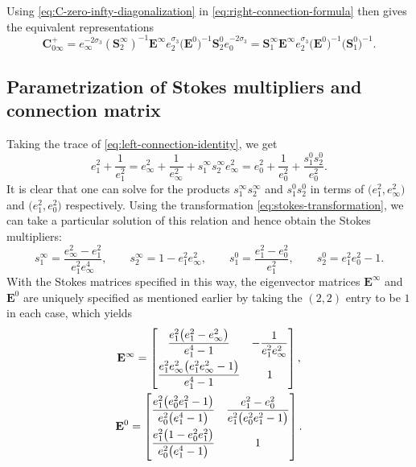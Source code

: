 \documentclass[11pt]{article}
\numberwithin{equation}{section}
\numberwithin{equation}{section}
\begin{document}
 Using \eqref{eq:C-zero-infty-diagonalization} in \eqref{eq:right-connection-formula} then gives the equivalent representations
 \begin{equation}
 \mathbf{C}_{0\infty}^+
 =e_\infty^{-2\sigma_3}(\mathbf{S}_{2}^\infty )^{-1}\mathbf{E}^\infty e_2^{\sigma_3}\big(\mathbf{E}^0\big)^{-1}\mathbf{S}^0_{2}e_0^{-2\sigma_3}
 =\mathbf{S}_{1}^\infty \mathbf{E}^\infty e_2^{\sigma_3}\big(\mathbf{E}^0\big)^{-1}\big(\mathbf{S}^0_{1}\big)^{-1}.
 \label{eq:C-zero-infty-plus-diagonalization}
 \end{equation}

 \subsection{Parametrization of Stokes multipliers and connection matrix}
 Taking the trace of \eqref{eq:left-connection-identity}, we get
\begin{equation*}
e_1^2+\frac{1}{e_1^2}=e_\infty^2+\frac1{e_\infty^2}+{s^\infty_1 s^\infty_2}{e_\infty^2}=e_0^2+\frac1{e_0^2}+\frac{s^0_1s^0_2}{e_0^2}.
\end{equation*}
It is clear that one can solve for the products $s^\infty_1s^\infty_2$ and $s_1^0s_2^0$ in terms of $\big(e_1^2,e_\infty^2\big)$ and $\big(e_1^2,e_0^2\big)$ respectively. Using the transformation \eqref{eq:stokes-transformation}, we can take a particular solution of this relation and hence obtain the Stokes multipliers:
\begin{equation}
\label{eq:stokes-parameters}
 s^\infty_1=\frac{e_\infty^2-e_1^2}{e_1^2e_\infty^4},\qquad s^\infty_2=1-e_1^2e_\infty^2,\qquad s^0_1=\frac{e_1^2-e_0^2}{e_1^2},\qquad s^0_2={e_1^2e_0^2 - 1}.
\end{equation}
With the Stokes matrices specified in this way, the eigenvector matrices $\mathbf{E}^\infty$ and $\mathbf{E}^0$ are uniquely specified as mentioned earlier by taking the $(2,2)$ entry to be $1$ in each case, which yields
\begin{gather}
\mathbf{E}^{\infty}=\left[
\begin{matrix}
 \dfrac{e_1^2 \big(e_1^2-e_\infty^2\big)}{e_1^4-1} & -\dfrac{1}{e_1^2e_\infty^2} \vspace{1mm} \\
 \dfrac{e_1^2 e_\infty^2\big(e_1^2 e_\infty^2-1\big)}{e_1^4-1} & 1
\end{matrix}
\right],\label{eq:E-infinity-formula}\\
\mathbf{E}^{0}=\left[
\begin{matrix}
 \dfrac{e_1^2 \big(e_0^2 e_1^2-1\big)}{e_0^2 \big(e_1^4-1\big)} & \dfrac{e_1^2-e_0^2}{e_1^2 \big(e_0^2 e_1^2-1\big)} \vspace{1mm}\\
 \dfrac{e_1^2 \big(1 - e_0^2 e_1^2\big)}{e_0^2 \big(e_1^4-1\big)} & 1
\end{matrix}
\right].\label{eq:E-zero-formula}
\end{gather}
\end{document}
